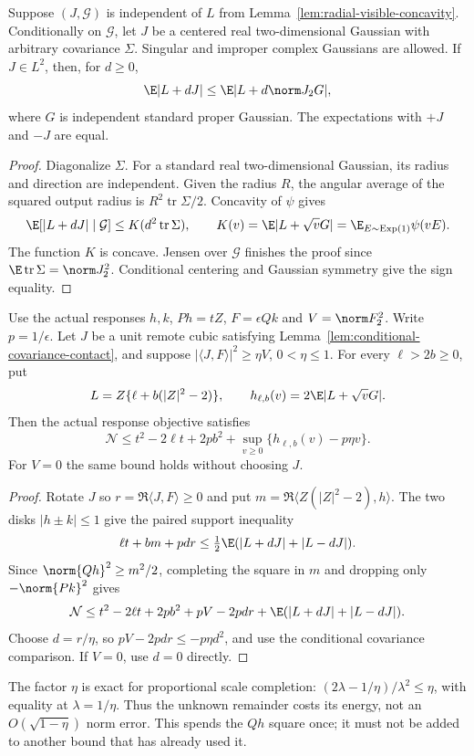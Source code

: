 \begin{lemma}
\label{lem:conditional-covariance-contact}
Suppose $(J,\mathcal G)$ is independent of $L$ from
Lemma~\ref{lem:radial-visible-concavity}. Conditionally on
$\mathcal G$, let $J$ be a centered real two-dimensional Gaussian
with arbitrary covariance $\Sigma$. Singular and improper complex
Gaussians are allowed. If $J\in L^2$, then, for $d\ge0$,
\[
 \E|L+dJ|\le\E|L+d\norm J_2G|,
\]
where $G$ is independent standard proper Gaussian. The expectations
with $+J$ and $-J$ are equal.
\end{lemma}
\begin{proof}
Diagonalize $\Sigma$. For a standard real two-dimensional Gaussian,
its radius and direction are independent. Given the radius $R$, the
angular average of the squared output radius is
$R^2\operatorname{tr}\Sigma/2$. Concavity of $\psi$ gives
\[
 \E[|L+dJ|\mid\mathcal G]
 \le K(d^2\operatorname{tr}\Sigma),\qquad
 K(v)=\E|L+\sqrt vG|=\E_{E\sim\mathrm{Exp}(1)}\psi(vE).
\]
The function $K$ is concave. Jensen over $\mathcal G$ finishes the
proof since $\E\operatorname{tr}\Sigma=\norm J_2^2$.
Conditional centering and Gaussian symmetry give the sign equality.
\end{proof}

\begin{lemma}
\label{lem:projection-price-dilution}
Use the actual responses $h,k$, $Ph=tZ$, $F=\epsilon Qk$ and
$V=\norm F_2^2$. Write $p=1/\epsilon$. Let $J$ be a unit remote
cubic satisfying Lemma~\ref{lem:conditional-covariance-contact}, and
suppose $|\langle J,F\rangle|^2\ge\eta V$, $0<\eta\le1$.
For every $\ell>2b\ge0$, put
\[
 L=Z\{\ell+b(|Z|^2-2)\},\qquad
 h_{\ell,b}(v)=2\E|L+\sqrt vG|.
\]
Then the actual response objective satisfies
\begin{equation}\label{eq:price-dilution-contact}
 \boxed{\mathcal N\le t^2-2\ell t+2pb^2+
   \sup_{v\ge0}\{h_{\ell,b}(v)-p\eta v\}.}
\end{equation}
For $V=0$ the same bound holds without choosing $J$.
\end{lemma}
\begin{proof}
Rotate $J$ so $r=\Re\langle J,F\rangle\ge0$ and put
$m=\Re\langle Z(|Z|^2-2),h\rangle$. The two disks $|h\pm k|\le1$
give the paired support inequality
\[
 \ell t+bm+pdr\le\tfrac12\E(|L+dJ|+|L-dJ|).
\]
Since $\norm{Qh}^2\ge m^2/2$, completing the square in $m$ and
dropping only $-\norm{Pk}^2$ gives
\[
 \mathcal N\le t^2-2\ell t+2pb^2+pV-2pdr+
          \E(|L+dJ|+|L-dJ|).
\]
Choose $d=r/\eta$, so $pV-2pdr\le-p\eta d^2$, and use the
conditional covariance comparison. If $V=0$, use $d=0$ directly.
\end{proof}
The factor $\eta$ is exact for proportional scale completion:
$(2\lambda-1/\eta)/\lambda^2\le\eta$, with equality at
$\lambda=1/\eta$. Thus the unknown remainder costs its energy,
not an $O(\sqrt{1-\eta})$ norm error. This spends the $Qh$ square
once; it must not be added to another bound that has already used it.


